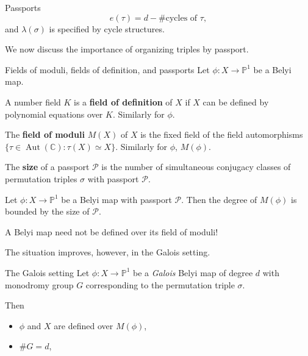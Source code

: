 \documentclass[xcolor=dvipsnames]{beamer}
\theoremstyle{plain}
\newcommand{\PP}{\mathbb P}
\newcommand{\CC}{\mathbb C}
\DeclareMathOperator{\Aut}{Aut}
\begin{document}
{\begin{frame}{Passports}
      $$
      e(\tau) = d-\#\text{cycles of }\tau,
      $$
      and $\lambda(\sigma)$ is specified by cycle structures.
      \pause
      \par
      We now discuss the importance of organizing triples by passport.
    \end{frame}
    \begin{frame}{Fields of moduli, fields of definition, and passports}
      Let $\phi\colon X\to\PP^1$ be a Belyi map.
      \pause\par
      A number field $K$ is a
      \textbf{field of definition} of $X$
      if $X$ can be defined by polynomial
      equations over $K$.
      Similarly for $\phi$.
      \pause\par
      The \textbf{field of moduli}
      $M(X)$
      of $X$ is
      the fixed field of the field
      automorphisms
      $\{\tau\in\Aut(\CC) : \tau(X)\simeq X\}$.
      Similarly for $\phi$, $M(\phi)$.
      \pause\par
      The \textbf{size} of a passport $\mathcal{P}$
      is the number of simultaneous conjugacy classes
      of permutation triples $\sigma$ with passport
      $\mathcal{P}$.
      \pause
      \begin{theorem}
        Let $\phi\colon X\to\PP^1$ be a
        Belyi map with passport $\mathcal{P}$.
        Then the degree of $M(\phi)$ is
        bounded by the size of $\mathcal{P}$.
      \end{theorem}
      \pause
      A Belyi map need not be defined
      over its field of moduli!
      \pause\par
      The situation improves, however,
      in the Galois setting.
    \end{frame}
    \begin{frame}{The Galois setting}
      Let $\phi\colon X\to\PP^1$ be a
      \emph{Galois} Belyi map of degree $d$
      with monodromy group $G$
      corresponding to the permutation triple
      $\sigma$.
      \pause\par
      Then
      \begin{itemize}
        \item
          $\phi$ and $X$ are defined over $M(\phi)$,
        \item
          $\#G = d$,

\end{itemize}
\end{frame}}
\end{document}
